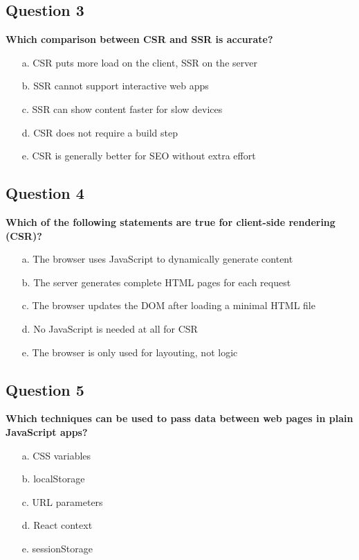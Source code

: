 \documentclass{article}
\begin{document}
\subsection*{Question 3}
\textbf{Which comparison between CSR and SSR is accurate?}

\begin{itemize}
  \item[a.] CSR puts more load on the client, SSR on the server
  \item[b.] SSR cannot support interactive web apps
  \item[c.] SSR can show content faster for slow devices
  \item[d.] CSR does not require a build step
  \item[e.] CSR is generally better for SEO without extra effort
\end{itemize}

\subsection*{Question 4}
\textbf{Which of the following statements are true for client-side rendering (CSR)?}

\begin{itemize}
  \item[a.] The browser uses JavaScript to dynamically generate content
  \item[b.] The server generates complete HTML pages for each request
  \item[c.] The browser updates the DOM after loading a minimal HTML file
  \item[d.] No JavaScript is needed at all for CSR
  \item[e.] The browser is only used for layouting, not logic
\end{itemize}

\subsection*{Question 5}
\textbf{Which techniques can be used to pass data between web pages in plain JavaScript apps?}

\begin{itemize}
  \item[a.] CSS variables
  \item[b.] localStorage
  \item[c.] URL parameters
  \item[d.] React context
  \item[e.] sessionStorage
\end{itemize}
\end{document}
